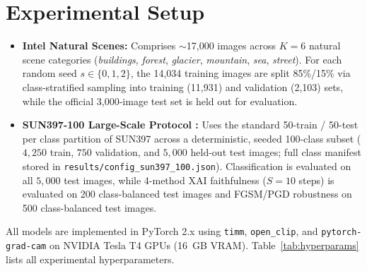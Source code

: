 \documentclass[final,5p,times,twocolumn]{elsarticle}
\begin{document}
\section{Experimental Setup}
\label{sec:setup}

\begin{itemize}
    \item \textbf{Intel Natural Scenes:} Comprises $\sim$17,000 images across $K=6$ natural scene categories (\emph{buildings}, \emph{forest}, \emph{glacier}, \emph{mountain}, \emph{sea}, \emph{street}). For each random seed $s \in \{0, 1, 2\}$, the 14,034 training images are split 85\%/15\% via class-stratified sampling into training (11,931) and validation (2,103) sets, while the official 3,000-image test set is held out for evaluation.
    \item \textbf{SUN397-100 Large-Scale Protocol \cite{xiao2010sun}:} Uses the standard 50-train / 50-test per class partition of SUN397 across a deterministic, seeded 100-class subset ($4,250$ train, $750$ validation, and $5,000$ held-out test images; full class manifest stored in \texttt{results/config\_sun397\_100.json}). Classification is evaluated on all $5,000$ test images, while 4-method XAI faithfulness ($S=10$ steps) is evaluated on 200 class-balanced test images and FGSM/PGD robustness on 500 class-balanced test images.
\end{itemize}

All models are implemented in PyTorch 2.x using \texttt{timm}, \texttt{open\_clip}, and \texttt{pytorch-grad-cam} on NVIDIA Tesla T4 GPUs (16~GB VRAM). Table~\ref{tab:hyperparams} lists all experimental hyperparameters.
\end{document}
